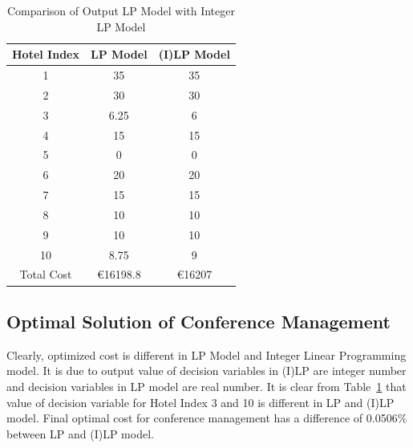 \documentclass[paper=a4, fontsize=11pt]{scrartcl} %
\begin{document}
\begin{table}[ht]
\centering
\begin{tabular}{@{}ccc@{}}
\toprule
\textbf{Hotel Index}     & \textbf{LP Model}         & \textbf{(I)LP Model}    \\ \midrule
\multicolumn{1}{|c|}{1}  & \multicolumn{1}{c|}{35}   & \multicolumn{1}{c|}{35} \\ \midrule
\multicolumn{1}{|c|}{2}  & \multicolumn{1}{c|}{30}   & \multicolumn{1}{c|}{30} \\ \midrule
\multicolumn{1}{|c|}{3}  & \multicolumn{1}{c|}{6.25} & \multicolumn{1}{c|}{6}  \\ \midrule
\multicolumn{1}{|c|}{4}  & \multicolumn{1}{c|}{15}   & \multicolumn{1}{c|}{15} \\ \midrule
\multicolumn{1}{|c|}{5}  & \multicolumn{1}{c|}{0}    & \multicolumn{1}{c|}{0}  \\ \midrule
\multicolumn{1}{|c|}{6}  & \multicolumn{1}{c|}{20}   & \multicolumn{1}{c|}{20} \\ \midrule
\multicolumn{1}{|c|}{7}  & \multicolumn{1}{c|}{15}   & \multicolumn{1}{c|}{15} \\ \midrule
\multicolumn{1}{|c|}{8}  & \multicolumn{1}{c|}{10}   & \multicolumn{1}{c|}{10} \\ \midrule
\multicolumn{1}{|c|}{9}  & \multicolumn{1}{c|}{10}   & \multicolumn{1}{c|}{10} \\ \midrule
\multicolumn{1}{|c|}{10} & \multicolumn{1}{c|}{8.75} & \multicolumn{1}{c|}{9}  \\ \midrule
\multicolumn{1}{|c|}{Total Cost} & \multicolumn{1}{c|}{\euro 16198.8} & \multicolumn{1}{c|}{\euro 16207}  \\ \midrule
\end{tabular}
\caption{Comparison of Output LP Model with Integer LP Model}
\label{tab:ilpmodel}
\end{table}
\subsection{Optimal Solution of Conference Management}
Clearly, optimized cost is different in LP Model and Integer Linear Programming model. It is due to output value of decision variables in (I)LP are integer number and decision variables in LP model  are real number. It is clear from Table~\ref{tab:ilpmodel} that value of decision variable for Hotel Index 3 and 10 is different in LP and (I)LP model. Final optimal cost for conference management has a difference of 0.0506\% between LP and (I)LP model.\\ 
\end{document}
